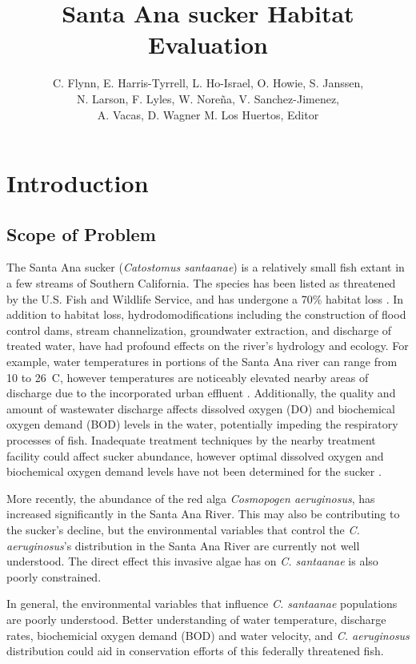 \documentclass{article}\usepackage[]{graphicx}\usepackage[]{color}
\title{Santa Ana sucker Habitat Evaluation}
\author{C. Flynn, E. Harris-Tyrrell, L. Ho-Israel, O. Howie, S. Janssen, \\N. Larson, F. Lyles, W. Nore\~na, V. Sanchez-Jimenez, \\A. Vacas, D. Wagner M. Los Huertos, Editor}
\affil{Environmental Analysis 30, Fall 2016, Pomona College}
\begin{document}
\maketitle

\newpage
\tableofcontents
\newpage

\section{Introduction}

\subsection{Scope of Problem}

The Santa Ana sucker (\emph{Catostomus santaanae}) is a relatively small fish extant in a few streams of Southern California. The species has been listed as threatened by the U.S. Fish and Wildlife Service, and has undergone a 70\% habitat loss \citep{obrien2011status, usfishandwildlifeservice14, wulff2017native}. In addition to habitat loss, hydrodomodifications including the construction of flood control dams, stream channelization, groundwater extraction, and discharge of treated water, have had profound effects on the river's hydrology and ecology. For example, water temperatures in portions of the Santa Ana river can range from 10 to 26\textdegree~C, however temperatures are noticeably elevated nearby areas of discharge due to the incorporated urban effluent \citep{greenfield70}. Additionally, the quality and amount of wastewater discharge affects dissolved oxygen (DO) and biochemical oxygen demand (BOD) levels in the water, potentially impeding the respiratory processes of fish. Inadequate treatment techniques by the nearby treatment facility could affect sucker abundance, however optimal dissolved oxygen and biochemical oxygen demand levels have not been determined for the sucker \citep{baskerville2012recovery}. 

More recently, the abundance of the red alga \emph{Cosmopogen aeruginosus}, has increased significantly in the Santa Ana River. This may also be contributing to the sucker's decline, but the environmental variables that control the \emph{C. aeruginosus}'s distribution in the Santa Ana River are currently not well understood. The direct effect this invasive algae has on \emph{C. santaanae} is also poorly constrained. 

In general, the environmental variables that influence \emph{C. santaanae} populations are poorly understood. Better understanding of water temperature, discharge rates, biochemicial oxygen demand (BOD) and water velocity, and \emph{C. aeruginosus} distribution could aid in conservation efforts of this federally threatened fish. 
\end{document}
